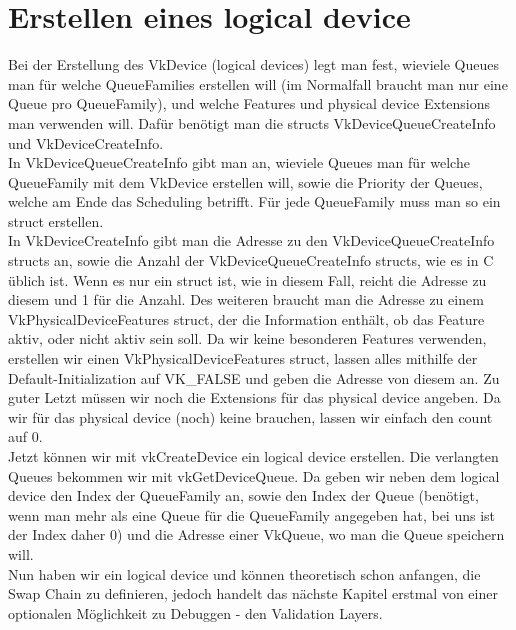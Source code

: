 \documentclass[11pt,a4paper]{report}
\begin{document}
\section{Erstellen eines logical device}
Bei der Erstellung des VkDevice (logical devices) legt man fest, wieviele Queues man für welche QueueFamilies erstellen will (im Normalfall braucht man nur eine Queue pro QueueFamily), und welche Features und physical device Extensions man verwenden will. Dafür benötigt man die structs VkDeviceQueueCreateInfo und VkDeviceCreateInfo.\\
In VkDeviceQueueCreateInfo gibt man an, wieviele Queues man für welche QueueFamily mit dem VkDevice erstellen will, sowie die Priority der Queues, welche am Ende das Scheduling betrifft. Für jede QueueFamily muss man so ein struct erstellen.\\
In VkDeviceCreateInfo gibt man die Adresse zu den VkDeviceQueueCreateInfo structs an, sowie die Anzahl der VkDeviceQueueCreateInfo structs, wie es in C üblich ist. Wenn es nur ein struct ist, wie in diesem Fall, reicht die Adresse zu diesem und 1 für die Anzahl. Des weiteren braucht man die Adresse zu einem VkPhysicalDeviceFeatures struct, der die Information enthält, ob das Feature aktiv, oder nicht aktiv sein soll. Da wir keine besonderen Features verwenden, erstellen wir einen VkPhysicalDeviceFeatures struct, lassen alles mithilfe der Default-Initialization auf VK\_FALSE und geben die Adresse von diesem an. Zu guter Letzt müssen wir noch die Extensions für das physical device angeben. Da wir für das physical device (noch) keine brauchen, lassen wir einfach den count auf 0.\\
Jetzt können wir mit vkCreateDevice ein logical device erstellen. Die verlangten Queues bekommen wir mit vkGetDeviceQueue. Da geben wir neben dem logical device den Index der QueueFamily an, sowie den Index der Queue (benötigt, wenn man mehr als eine Queue für die QueueFamily angegeben hat, bei uns ist der Index daher 0) und die Adresse einer VkQueue, wo man die Queue speichern will.\\
Nun haben wir ein logical device und können theoretisch schon anfangen, die Swap Chain zu definieren, jedoch handelt das nächste Kapitel erstmal von einer optionalen Möglichkeit zu Debuggen - den Validation Layers.
\end{document}
